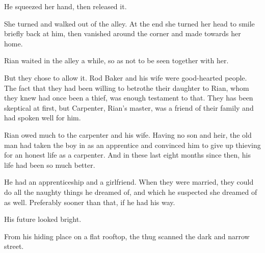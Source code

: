 He squeezed her hand, then released it. 

She turned and walked out of the alley. 
At the end she turned her head to smile briefly back at him, then vanished around the corner and made towards her home. 


Rian waited in the alley a while, so as not to be seen together with her. 

But they chose to allow it. 
Rod Baker and his wife were good-hearted people. 
The fact that they had been willing to betrothe their daughter to Rian, whom they knew had once been a thief, was enough testament to that. 
They has been skeptical at first, but \Bryon{} Carpenter, Rian's master, was a friend of their family and had spoken well for him. 

Rian owed much to the carpenter and his wife. 
Having no son and heir, the old man had taken the boy in as an apprentice and convinced him to give up thieving for an honest life as a carpenter. 
And in these last eight months since then, his life had been so much better. 

% 
% 
He had an apprenticeship and a girlfriend. 
When they were married, they could do all the naughty things he dreamed of, and which he suspected she dreamed of as well. 
Preferably sooner than that, if he had his way. 

His future looked bright. 








\begin{comment}
\section{Thug watching}
\end{comment}
\new
From his hiding place on a flat rooftop, the thug scanned the dark and narrow street. 

